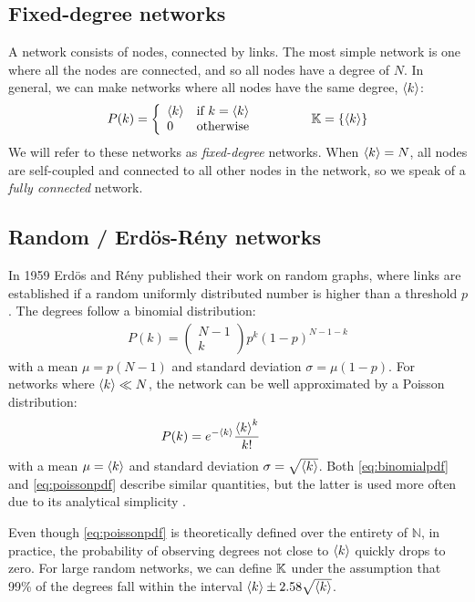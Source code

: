 \subsection{Fixed-degree networks}
\noindent A network consists of nodes, connected by links. The most simple network is one where all the nodes are connected, and so all nodes have a degree of $N$. In general, we can make networks where all nodes have the same degree, ${\langle k\rangle}$:
\begin{align}
P(k) = \left\{\begin{array}{ll}\kmean & \text{if } k=\kmean \\0 & \text{otherwise}\end{array}\right. \hspace{15mm} \K = \{ \kmean \} \label{eq:diracpdf}
\end{align}
We will refer to these networks as \textsl{fixed-degree} networks. When ${\langle k\rangle} = N$, all nodes are self-coupled and connected to all other nodes in the network, so we speak of a \textsl{fully connected} network. 


\subsection{Random / Erd{\"o}s-R{\'e}ny networks}
In 1959 Erd{\"o}s and R{\'e}ny published their work on random graphs\cite{RandomGraphs1959}, where links are established if a random uniformly distributed number is higher than a threshold $p$. The degrees follow a binomial distribution: 
\begin{align}
P(k)=\left(\begin{array}{c}N-1 \\ k\end{array}\right) p^{k}(1-p)^{N-1-k} \label{eq:binomialpdf}
\end{align}
with a mean $\mu = p(N-1)$ and standard deviation $\sigma = \mu(1-p)$. For networks where ${\langle k\rangle} \ll N$, the network can be well approximated by a Poisson distribution:
\begin{align}
P(k) = e^{-\kmean} \frac{\kmean^{k}}{k !} \hspace{15mm} \label{eq:poissonpdf}
\end{align}
with a mean $\mu = {\langle k\rangle}$ and standard deviation $\sigma = \sqrt{{\langle k\rangle}}$. Both \eqref{eq:binomialpdf} and \eqref{eq:poissonpdf} describe similar quantities, but the latter is used more often due to its analytical simplicity \cite{BarabasiNetworkBook2016}. 

Even though \eqref{eq:poissonpdf} is theoretically defined over the entirety of $\mathbb{N}$, in practice, the probability of observing degrees not close to ${\langle k\rangle}$ quickly drops to zero. For large random networks, we can define ${\mathbb{K}}$ under the assumption that 99\% of the degrees fall within the interval ${\langle k\rangle} \pm 2.58 \sqrt{{\langle k\rangle}}$.

